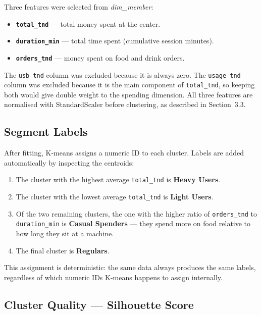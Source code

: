 Three features were selected from \textit{dim\_member}:

\begin{itemize}[noitemsep]
  \item \textbf{\texttt{total\_tnd}} --- total money spent at the center.
  \item \textbf{\texttt{duration\_min}} --- total time spent (cumulative session
        minutes).
  \item \textbf{\texttt{orders\_tnd}} --- money spent on food and drink orders.
\end{itemize}

The \texttt{usb\_tnd} column was excluded because it is always zero. The
\texttt{usage\_tnd} column was excluded because it is the main component of
\texttt{total\_tnd}, so keeping both would give double weight to the spending dimension.
All three features are normalised with StandardScaler before clustering, as described
in Section~3.3.

\subsection{Segment Labels}

After fitting, K-means assigns a numeric ID to each cluster. Labels are added
automatically by inspecting the centroids:

\begin{enumerate}
  \item The cluster with the highest average \texttt{total\_tnd} is
        \textbf{Heavy Users}.
  \item The cluster with the lowest average \texttt{total\_tnd} is
        \textbf{Light Users}.
  \item Of the two remaining clusters, the one with the higher ratio of
        \texttt{orders\_tnd} to \texttt{duration\_min} is \textbf{Casual Spenders} ---
        they spend more on food relative to how long they sit at a machine.
  \item The final cluster is \textbf{Regulars}.
\end{enumerate}

This assignment is deterministic: the same data always produces the same labels,
regardless of which numeric IDs K-means happens to assign internally.

\subsection{Cluster Quality --- Silhouette Score}

